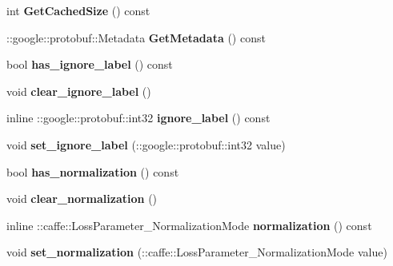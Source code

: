 \begin{DoxyCompactItemize}
int {\bfseries Get\+Cached\+Size} () const
\item 
\mbox{\label{classcaffe_1_1_loss_parameter_af610e9c281057b875e8ce6a12c1d96a3}} 
\+::google\+::protobuf\+::\+Metadata {\bfseries Get\+Metadata} () const
\item 
\mbox{\label{classcaffe_1_1_loss_parameter_a1f9932ad9b6ed5d3ef1bdbe9d0e4d6b9}} 
bool {\bfseries has\+\_\+ignore\+\_\+label} () const
\item 
\mbox{\label{classcaffe_1_1_loss_parameter_a3bc7dc99841165f1133597325fd3c8ce}} 
void {\bfseries clear\+\_\+ignore\+\_\+label} ()
\item 
\mbox{\label{classcaffe_1_1_loss_parameter_a8d6caf81ddc1364b0a6f51b4b33c5fca}} 
inline \+::google\+::protobuf\+::int32 {\bfseries ignore\+\_\+label} () const
\item 
\mbox{\label{classcaffe_1_1_loss_parameter_ac59a5a574e80df12200af33eb7aba560}} 
void {\bfseries set\+\_\+ignore\+\_\+label} (\+::google\+::protobuf\+::int32 value)
\item 
\mbox{\label{classcaffe_1_1_loss_parameter_ab521e29dcae6493bc1759bc9e480ca03}} 
bool {\bfseries has\+\_\+normalization} () const
\item 
\mbox{\label{classcaffe_1_1_loss_parameter_a8e7bfd5e2330e6a377751288865db2d0}} 
void {\bfseries clear\+\_\+normalization} ()
\item 
\mbox{\label{classcaffe_1_1_loss_parameter_a81e8ba621ef4a53a1bbc98328432186d}} 
inline \+::caffe\+::\+Loss\+Parameter\+\_\+\+Normalization\+Mode {\bfseries normalization} () const
\item 
\mbox{\label{classcaffe_1_1_loss_parameter_aa6943f13929b8fab839f040fca955ed0}} 
void {\bfseries set\+\_\+normalization} (\+::caffe\+::\+Loss\+Parameter\+\_\+\+Normalization\+Mode value)
\item 
\mbox{\label{classcaffe_1_1_loss_parameter_afa5657c1d69e053530abb6630aaa4cf7}} 

\end{DoxyCompactItemize}

